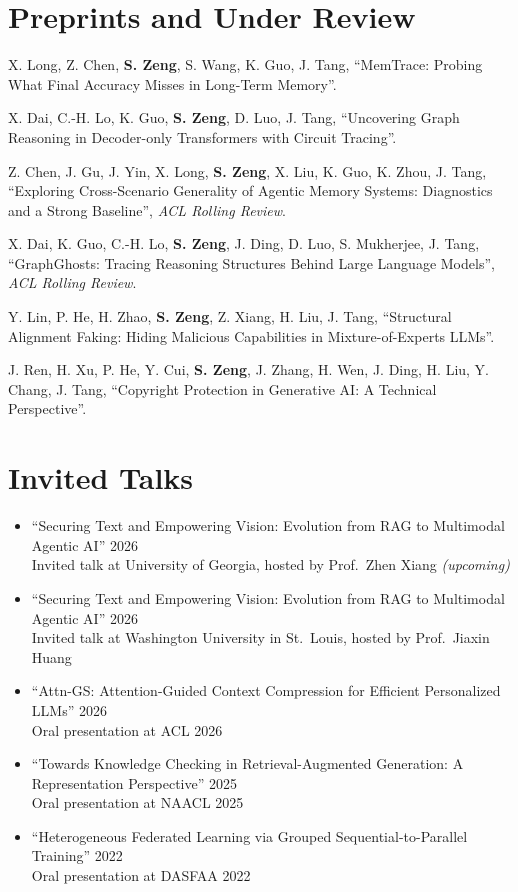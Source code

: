 \documentclass[12pt,letterpaper]{article}
\newenvironment{publist}{%
  \begin{list}{}{%
    \setlength{\leftmargin}{34mm}%
    \setlength{\labelwidth}{32mm}%
    \setlength{\labelsep}{2mm}%
    \setlength{\itemsep}{1.5mm}%
    \setlength{\parsep}{0pt}%
    \setlength{\topsep}{1.5mm}%
    \renewcommand{\makelabel}[1]{\bfseries\color{accent}##1\hfill}%
  }}{\end{list}}
\begin{document}
\section{Preprints and Under Review}
\begin{publist}
\item[{[Preprint]}] X. Long, Z. Chen, \textbf{S. Zeng}, S. Wang, K. Guo, J. Tang, ``MemTrace: Probing What Final Accuracy Misses in Long-Term Memory''.
\item[{[Preprint]}] X. Dai, C.-H. Lo, K. Guo, \textbf{S. Zeng}, D. Luo, J. Tang, ``Uncovering Graph Reasoning in Decoder-only Transformers with Circuit Tracing''.
\item[{[Under review]}] Z. Chen, J. Gu, J. Yin, X. Long, \textbf{S. Zeng}, X. Liu, K. Guo, K. Zhou, J. Tang, ``Exploring Cross-Scenario Generality of Agentic Memory Systems: Diagnostics and a Strong Baseline'', \textit{ACL Rolling Review}.
\item[{[Under review]}] X. Dai, K. Guo, C.-H. Lo, \textbf{S. Zeng}, J. Ding, D. Luo, S. Mukherjee, J. Tang, ``GraphGhosts: Tracing Reasoning Structures Behind Large Language Models'', \textit{ACL Rolling Review}.
\item[{[Preprint]}] Y. Lin, P. He, H. Zhao, \textbf{S. Zeng}, Z. Xiang, H. Liu, J. Tang, ``Structural Alignment Faking: Hiding Malicious Capabilities in Mixture-of-Experts LLMs''.
\item[{[Preprint]}] J. Ren, H. Xu, P. He, Y. Cui, \textbf{S. Zeng}, J. Zhang, H. Wen, J. Ding, H. Liu, Y. Chang, J. Tang, ``Copyright Protection in Generative AI: A Technical Perspective''.
\end{publist}

\section{Invited Talks}
\begin{itemize}
  \item ``Securing Text and Empowering Vision: Evolution from RAG to Multimodal Agentic AI'' \hfill 2026 \\
        Invited talk at University of Georgia, hosted by Prof.\ Zhen Xiang \emph{(upcoming)}
  \item ``Securing Text and Empowering Vision: Evolution from RAG to Multimodal Agentic AI'' \hfill 2026 \\
        Invited talk at Washington University in St.\ Louis, hosted by Prof.\ Jiaxin Huang
  \item ``Attn-GS: Attention-Guided Context Compression for Efficient Personalized LLMs'' \hfill 2026 \\
        Oral presentation at ACL 2026
  \item ``Towards Knowledge Checking in Retrieval-Augmented Generation: A Representation Perspective'' \hfill 2025 \\
        Oral presentation at NAACL 2025
  \item ``Heterogeneous Federated Learning via Grouped Sequential-to-Parallel Training'' \hfill 2022 \\
        Oral presentation at DASFAA 2022
\end{itemize}
\end{document}
